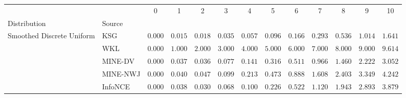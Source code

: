 \begin{tabular}{llccccccccccc}
\toprule
 &  & 0 & 1 & 2 & 3 & 4 & 5 & 6 & 7 & 8 & 9 & 10 \\
Distribution & Source &  &  &  &  &  &  &  &  &  &  &  \\
\midrule
\multirow[l]{5}{*}{Smoothed Discrete Uniform} & KSG & $ 0.000 $ & $ 0.015 $ & $ 0.018 $ & $ 0.035 $ & $ 0.057 $ & $ 0.096 $ & $ 0.166 $ & $ 0.293 $ & $ 0.536 $ & $ 1.014 $ & $ 1.641 $ \\
 & WKL & $ 0.000 $ & $ 1.000 $ & $ 2.000 $ & $ 3.000 $ & $ 4.000 $ & $ 5.000 $ & $ 6.000 $ & $ 7.000 $ & $ 8.000 $ & $ 9.000 $ & $ 9.614 $ \\
 & MINE-DV & $ 0.000 $ & $ 0.037 $ & $ 0.036 $ & $ 0.077 $ & $ 0.141 $ & $ 0.316 $ & $ 0.511 $ & $ 0.966 $ & $ 1.460 $ & $ 2.222 $ & $ 3.052 $ \\
 & MINE-NWJ & $ 0.000 $ & $ 0.040 $ & $ 0.047 $ & $ 0.099 $ & $ 0.213 $ & $ 0.473 $ & $ 0.888 $ & $ 1.608 $ & $ 2.403 $ & $ 3.349 $ & $ 4.242 $ \\
 & InfoNCE & $ 0.000 $ & $ 0.038 $ & $ 0.030 $ & $ 0.068 $ & $ 0.100 $ & $ 0.226 $ & $ 0.522 $ & $ 1.120 $ & $ 1.943 $ & $ 2.893 $ & $ 3.879 $ \\
\bottomrule
\end{tabular}
